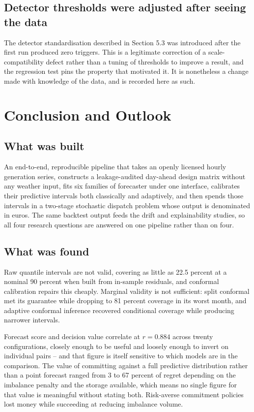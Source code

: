 \documentclass[11pt,a4paper,oneside]{report}
\begin{document}
\section{Detector thresholds were adjusted after seeing the data}

The detector standardisation described in Section 5.3 was introduced after the first run produced zero triggers. This is a legitimate correction of a scale-compatibility defect rather than a tuning of thresholds to improve a result, and the regression test pins the property that motivated it. It is nonetheless a change made with knowledge of the data, and is recorded here as such.


\chapter{Conclusion and Outlook}

\section{What was built}

An end-to-end, reproducible pipeline that takes an openly licensed hourly generation series, constructs a leakage-audited day-ahead design matrix without any weather input, fits six families of forecaster under one interface, calibrates their predictive intervals both classically and adaptively, and then spends those intervals in a two-stage stochastic dispatch problem whose output is denominated in euros. The same backtest output feeds the drift and explainability studies, so all four research questions are answered on one pipeline rather than on four.

\section{What was found}

Raw quantile intervals are not valid, covering as little as 22.5 percent at a nominal 90 percent when built from in-sample residuals, and conformal calibration repairs this cheaply. Marginal validity is not sufficient: split conformal met its guarantee while dropping to 81 percent coverage in its worst month, and adaptive conformal inference recovered conditional coverage while producing narrower intervals.

Forecast score and decision value correlate at $r = 0.884$ across twenty configurations, closely enough to be useful and loosely enough to invert on individual pairs -- and that figure is itself sensitive to which models are in the comparison. The value of committing against a full predictive distribution rather than a point forecast ranged from 3 to 67 percent of regret depending on the imbalance penalty and the storage available, which means no single figure for that value is meaningful without stating both. Risk-averse commitment policies lost money while succeeding at reducing imbalance volume.
\end{document}
